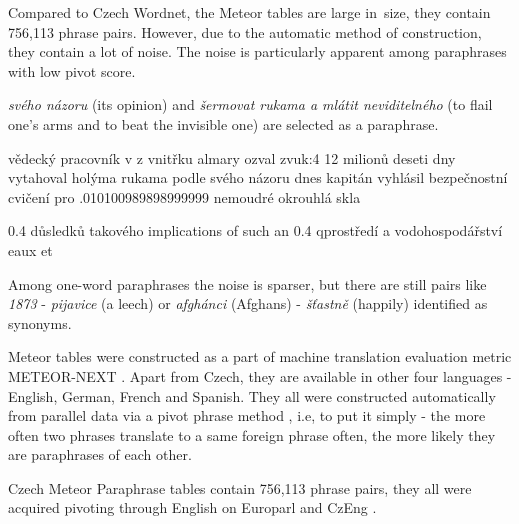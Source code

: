Compared to Czech Wordnet, the Meteor tables are large in~size, they contain 756,113 phrase pairs. 
However, due to the automatic method of construction, they contain a lot of noise. 
The noise is particularly apparent among paraphrases with low pivot score.

\textit{svého názoru}  (its opinion) and \textit{šermovat rukama a 
mlátit neviditelného} (to flail one's arms and to beat the invisible one) are 
selected as a paraphrase. 

vědecký pracovník v     z vnitřku almary ozval zvuk:4
12 milionů      deseti dny vytahoval holýma rukama
podle svého názoru      dnes kapitán vyhlásil bezpečnostní cvičení pro
.010100989898999999    nemoudré        okrouhlá skla

0.4    důsledků takového       implications of such an
0.4	 qprostředí a vodohospodářství    eaux et

Among one-word paraphrases the noise is sparser, but there are still pairs like 
\textit{1873} - \textit{pijavice} (a leech) or \textit{afgh\'{a}nci} (Afghans) - 
\textit{š\v{t}astně} (happily) identified as synonyms. 





Meteor tables were constructed as a part of machine translation evaluation 
metric METEOR-NEXT \citep{meteor-tables}. Apart from Czech, they are available 
in other four languages - English, German, French and Spanish. 
They all were constructed automatically from parallel data via a pivot phrase 
method \citep{pivoting}, i.e, to put it simply -  the more often two phrases 
translate to a same foreign phrase often, the more likely they are paraphrases 
of each other.

Czech Meteor Paraphrase tables contain 756,113 phrase 
pairs, they all were acquired pivoting through English on Europarl and CzEng 
\citep{czeng}.


